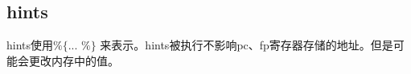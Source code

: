 \subsection{hints}\label{subsec: processor-hints}
hints使用$\texttt{\%\{ ... \%\}}$ 来表示。hints被执行不影响pc、fp寄存器存储的地址。但是可能会更改内存中的值。